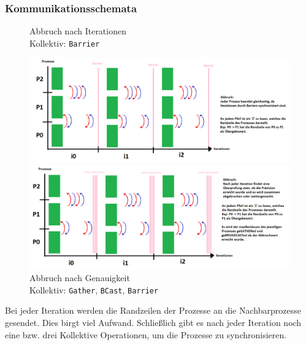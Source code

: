 \documentclass[12pt]{article}
\begin{document}
\begin{sloppypar}
\subsubsection*{Kommunikationsschemata}
\begin{figure}[ht]
    \centering
    \caption*{Abbruch nach Iterationen \\ Kollektiv: \texttt{Barrier}}
    \begin{minipage}[t]{0.99\textwidth}
        \includegraphics[width=\textwidth]{res/Kommunikation-Iterations.PNG}
    \end{minipage}
    \vspace*{2em}
    \caption*{Abbruch nach Genauigkeit \\ Kollektiv: \texttt{Gather}, \texttt{BCast}, \texttt{Barrier}}
    \begin{minipage}[t]{0.99\textwidth}
        \includegraphics[width=\textwidth]{res/Kommunikation-Residuum.PNG}
    \end{minipage}
\end{figure}

Bei jeder Iteration werden die Randzeilen der Prozesse an die Nachbarprozesse gesendet. Dies birgt viel Aufwand. Schließlich gibt es nach jeder Iteration noch eine bzw. drei Kollektive Operationen, um die Prozesse zu synchronisieren. \\

\end{sloppypar}
\end{document}

